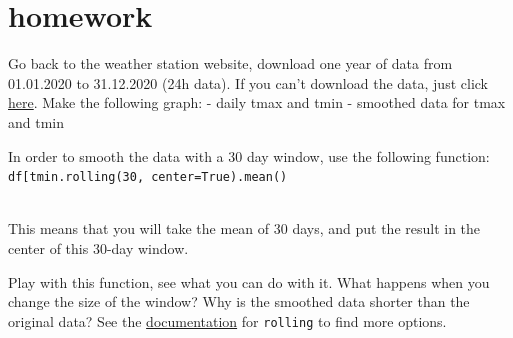 \documentclass[
  letterpaper,
  DIV=11,
  numbers=noendperiod]{scrreprt}
\begin{document}
\hypertarget{homework}{%
\chapter{homework}\label{homework}}

Go back to the weather station website, download one year of data from
01.01.2020 to 31.12.2020 (24h data). If you can't download the data,
just click \href{https://yairmau.com/archive/hydrology/1year.csv}{here}.
Make the following graph: - daily tmax and tmin - smoothed data for tmax
and tmin

In order to smooth the data with a 30 day window, use the following
function:\\
\texttt{df{[}\textquotesingle{}tmin\textquotesingle{}{]}.rolling(30,\ center=True).mean()}\strut \\
This means that you will take the mean of 30 days, and put the result in
the center of this 30-day window.

Play with this function, see what you can do with it. What happens when
you change the size of the window? Why is the smoothed data shorter than
the original data? See the
\href{https://pandas.pydata.org/pandas-docs/stable/reference/api/pandas.DataFrame.rolling.html}{documentation}
for \texttt{rolling} to find more options.
\end{document}
